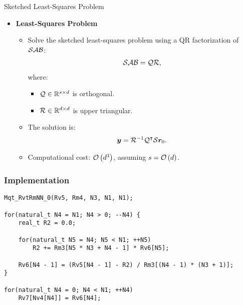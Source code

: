 \begin{frame}{Sketched Least-Squares Problem}
    \begin{itemize}
        \item \textbf{Least-Squares Problem}
        \begin{itemize}
            \item Solve the sketched least-squares problem using a QR factorization of $\mathcal{S} \mathcal{A} \mathcal{B}$:
            \begin{align}
                \mathcal{S} \mathcal{A} \mathcal{B} = \mathcal{Q} \mathcal{R},
            \end{align}
            where:
            \begin{itemize}
                \item $\mathcal{Q} \in \mathbb{R}^{s \times d}$ is orthogonal.
                \item $\mathcal{R} \in \mathbb{R}^{d \times d}$ is upper triangular.
            \end{itemize}
            \item The solution is:
            \begin{align}
                \bm{y} = \mathcal{R}^{-1} \mathcal{Q}^{\intercal} \mathcal{S} \bm{r}_0.
            \end{align}
            \item Computational cost: $\mathcal{O} \left( d^3 \right)$, assuming $s = \mathcal{O} \left( d \right)$.
        \end{itemize}
    \end{itemize}
\end{frame}

\begin{frame}[fragile] %
    \frametitle{Implementation}

\begin{lstlisting}[style=cpp]
Mqt_RvtRmNN_0(Rv5, Rm4, N3, N1, N1);

for(natural_t N4 = N1; N4 > 0; --N4) {
    real_t R2 = 0.0;

    for(natural_t N5 = N4; N5 < N1; ++N5)
        R2 += Rm3[N5 * N3 + N4 - 1] * Rv6[N5];

    Rv6[N4 - 1] = (Rv5[N4 - 1] - R2) / Rm3[(N4 - 1) * (N3 + 1)];
}

for(natural_t N4 = 0; N4 < N1; ++N4)
    Rv7[Nv4[N4]] = Rv6[N4];
\end{lstlisting}

\end{frame}

